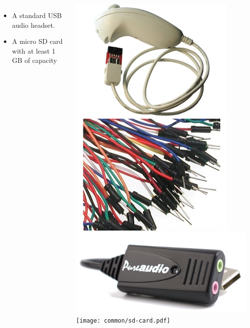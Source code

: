 \begin{frame}
\begin{columns}
\begin{itemize}
      \item A standard USB audio headset.
      \item A micro SD card with at least 1 GB of capacity
    \end{itemize}
    \includegraphics[height=0.25\textheight]{common/nunchuk.jpg} \\
    \includegraphics[height=0.15\textheight]{common/jumper-wires.jpg} \\
    \includegraphics[height=0.15\textheight]{common/usb-audio.png} \\
    \texttt{[image: common/sd-card.pdf]}
  \end{columns}
\end{frame}
